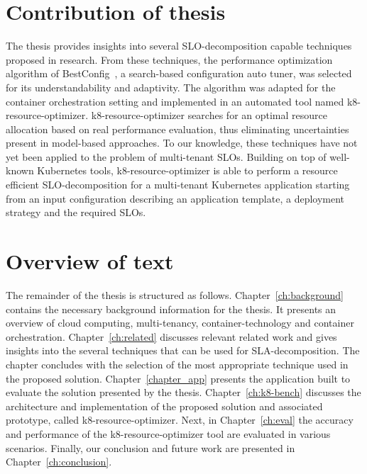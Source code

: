 \section{Contribution of thesis}
 The thesis provides insights into several SLO-decomposition capable techniques proposed in research. From these techniques, the performance optimization algorithm of BestConfig~\cite{zhu2017bestconfig}, a search-based configuration auto tuner, was selected for its understandability and adaptivity. The algorithm was adapted for the container orchestration setting and implemented in an automated tool named k8-resource-optimizer. k8-resource-optimizer searches for an optimal resource allocation based on real performance evaluation, thus eliminating uncertainties present in model-based approaches. To our knowledge, these techniques have not yet been applied to the problem of multi-tenant SLOs.
 Building on top of well-known Kubernetes tools, k8-resource-optimizer is able to perform a resource efficient SLO-decomposition for a multi-tenant Kubernetes application starting from  an input configuration describing an application template, a deployment strategy and the required SLOs.


\section{Overview of text}
The remainder of the thesis is structured as follows. Chapter~\ref{ch:background} contains the necessary background information for the thesis. It presents an overview of cloud computing, multi-tenancy, container-technology and container orchestration. Chapter~\ref{ch:related} discusses relevant related work and gives insights into the several techniques that can be used for SLA-decomposition. The chapter concludes with the selection of the most appropriate technique used in the proposed solution. Chapter~\ref{chapter_app} presents the application built to evaluate the solution presented by the thesis. Chapter~\ref{ch:k8-bench} discusses the architecture and implementation of the proposed solution and associated prototype, called k8-resource-optimizer. Next, in Chapter~\ref{ch:eval} the accuracy and performance of the k8-resource-optimizer tool are evaluated in various scenarios. Finally, our conclusion and future work are presented in Chapter~\ref{ch:conclusion}. 




